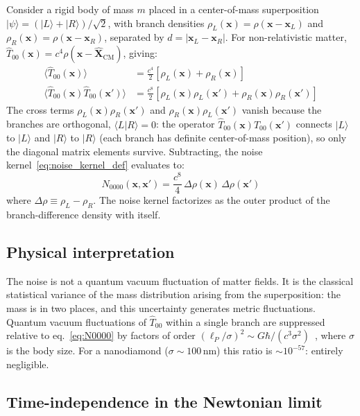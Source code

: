 \documentclass[12pt,a4paper]{article}
\begin{document}
Consider a rigid body of mass $m$ placed in a center-of-mass superposition
$|\psi\rangle = (|L\rangle + |R\rangle)/\sqrt{2}$, with branch densities
$\rho_L(\mathbf{x}) = \rho(\mathbf{x}-\mathbf{x}_L)$ and
$\rho_R(\mathbf{x}) = \rho(\mathbf{x}-\mathbf{x}_R)$, separated by
$d = |\mathbf{x}_L - \mathbf{x}_R|$. For non-relativistic matter,
$\hat{T}_{00}(\mathbf{x}) = c^4\rho(\mathbf{x}-\hat{\mathbf{X}}_{\text{CM}})$, giving:
\begin{align}
\langle\hat{T}_{00}(\mathbf{x})\rangle &=
\tfrac{c^4}{2}\!\left[\rho_L(\mathbf{x}) + \rho_R(\mathbf{x})\right] \\
\langle\hat{T}_{00}(\mathbf{x})\hat{T}_{00}(\mathbf{x}')\rangle &=
\tfrac{c^8}{2}\!\left[\rho_L(\mathbf{x})\rho_L(\mathbf{x}')
+ \rho_R(\mathbf{x})\rho_R(\mathbf{x}')\right]
\end{align}
The cross terms $\rho_L(\mathbf{x})\rho_R(\mathbf{x}')$ and
$\rho_R(\mathbf{x})\rho_L(\mathbf{x}')$ vanish because the branches are orthogonal,
$\langle L|R\rangle = 0$: the operator
$\hat{T}_{00}(\mathbf{x})\hat{T}_{00}(\mathbf{x}')$ connects $|L\rangle$ to $|L\rangle$
and $|R\rangle$ to $|R\rangle$ (each branch has definite center-of-mass position), so only
the diagonal matrix elements survive.
Subtracting, the noise kernel~\eqref{eq:noise_kernel_def} evaluates to:
\begin{equation}
N_{0000}(\mathbf{x},\mathbf{x}') = \frac{c^8}{4}\,\Delta\rho(\mathbf{x})\,\Delta\rho(\mathbf{x}')
\label{eq:N0000}
\end{equation}
where $\Delta\rho \equiv \rho_L - \rho_R$. The noise kernel factorizes as the outer
product of the branch-difference density with itself.

\subsection{Physical interpretation}

The noise is not a quantum vacuum fluctuation of matter fields. It is the classical
statistical variance of the mass distribution arising from the superposition: the mass is
in two places, and this uncertainty generates metric fluctuations. Quantum vacuum fluctuations of $\hat{T}_{00}$
within a single branch are suppressed relative to eq.~\eqref{eq:N0000} by factors of
order $(\ell_P/\sigma)^2 \sim G\hbar/(c^3\sigma^2)$~\cite{phillips_hu}, where $\sigma$
is the body size. For a nanodiamond ($\sigma \sim 100\,\text{nm}$) this ratio is
$\sim 10^{-57}$: entirely negligible.

\subsection{Time-independence in the Newtonian limit}
\end{document}
